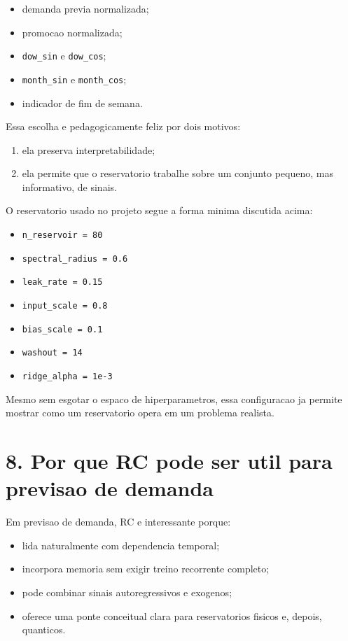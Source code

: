 \documentclass[12pt]{article}
\providecommand{\tightlist}{%
  \setlength{\itemsep}{0pt}\setlength{\parskip}{0pt}}
\begin{document}
\begin{itemize}
\tightlist
\item
  demanda previa normalizada;
\item
  promocao normalizada;
\item
  \texttt{dow\_sin} e \texttt{dow\_cos};
\item
  \texttt{month\_sin} e \texttt{month\_cos};
\item
  indicador de fim de semana.
\end{itemize}

Essa escolha e pedagogicamente feliz por dois motivos:

\begin{enumerate}
\def\labelenumi{\arabic{enumi}.}
\tightlist
\item
  ela preserva interpretabilidade;
\item
  ela permite que o reservatorio trabalhe sobre um conjunto pequeno, mas informativo, de sinais.
\end{enumerate}

O reservatorio usado no projeto segue a forma minima discutida acima:

\begin{itemize}
\tightlist
\item
  \texttt{n\_reservoir\ =\ 80}
\item
  \texttt{spectral\_radius\ =\ 0.6}
\item
  \texttt{leak\_rate\ =\ 0.15}
\item
  \texttt{input\_scale\ =\ 0.8}
\item
  \texttt{bias\_scale\ =\ 0.1}
\item
  \texttt{washout\ =\ 14}
\item
  \texttt{ridge\_alpha\ =\ 1e-3}
\end{itemize}

Mesmo sem esgotar o espaco de hiperparametros, essa configuracao ja permite mostrar como um reservatorio opera em um problema realista.

\section{8. Por que RC pode ser util para previsao de demanda}\label{8-por-que-rc-pode-ser-util-para-previsao-de-demanda}

Em previsao de demanda, RC e interessante porque:

\begin{itemize}
\tightlist
\item
  lida naturalmente com dependencia temporal;
\item
  incorpora memoria sem exigir treino recorrente completo;
\item
  pode combinar sinais autoregressivos e exogenos;
\item
  oferece uma ponte conceitual clara para reservatorios fisicos e, depois, quanticos.
\end{itemize}
\end{document}
